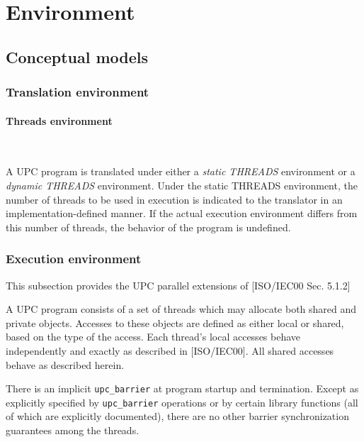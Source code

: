 \documentclass[12pt,titlepage]{article}
\newcounter{parnum}
\newcommand\np{\addtocounter{parnum}{1}\hspace{-2em}\makebox[2em][l]{\arabic{parnum}}}
\begin{document}
\pagebreak
\section{Environment}

\subsection{Conceptual models}
\subsubsection{Translation environment}

\paragraph{Threads environment}\ \\

\np A UPC program is translated under either a {\em static
      THREADS} environment or a {\em dynamic THREADS} environment. Under
      the static THREADS environment, the number of threads to be
      used in execution is indicated to the translator in an
      implementation-defined manner. If the actual execution
      environment differs from this number of threads, the behavior of
      the program is undefined.
       
\subsubsection{Execution environment}

\np This subsection provides the UPC parallel extensions of
   [ISO/IEC00 Sec. 5.1.2]
   
\np A UPC program consists of a set of threads which may
      allocate both shared and private objects.  
      Accesses to these objects are defined as either
      local or shared, based on the type of the access.  Each thread's local
      accesses behave independently and exactly as described in 
      [ISO/IEC00].  All shared accesses behave as described herein.

\np There is an implicit {\tt upc\_barrier} at program startup
     and termination.  Except as explicitly specified by {\tt upc\_barrier} operations
     or by certain library functions (all of which are explicitly documented), there
     are no other barrier synchronization guarantees among the threads.
\end{document}
